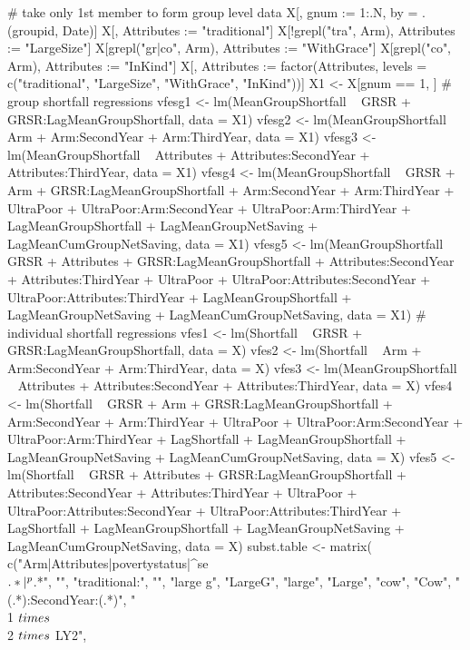 \begin{Schunk}
\begin{Sinput}
# take only 1st member to form group level data
X[, gnum := 1:.N, by = .(groupid, Date)]
X[, Attributes := "traditional"]
X[!grepl("tra", Arm), Attributes := "LargeSize"]
X[grepl("gr|co", Arm), Attributes := "WithGrace"]
X[grepl("co", Arm), Attributes := "InKind"]
X[, Attributes := factor(Attributes, 
  levels = c("traditional", "LargeSize", "WithGrace", "InKind"))]
X1 <- X[gnum == 1, ]
# group shortfall regressions
vfesg1 <- lm(MeanGroupShortfall  ~ 
  GRSR + GRSR:LagMeanGroupShortfall, data = X1)
vfesg2 <- lm(MeanGroupShortfall ~  
  Arm + Arm:SecondYear + Arm:ThirdYear, 
  data = X1)
vfesg3 <- lm(MeanGroupShortfall ~  
  Attributes + Attributes:SecondYear + Attributes:ThirdYear, 
  data = X1)
vfesg4 <- lm(MeanGroupShortfall ~ 
  GRSR + Arm + GRSR:LagMeanGroupShortfall + 
  Arm:SecondYear + Arm:ThirdYear +
  UltraPoor + UltraPoor:Arm:SecondYear + UltraPoor:Arm:ThirdYear +
  LagMeanGroupShortfall +
  LagMeanGroupNetSaving + LagMeanCumGroupNetSaving,
  data = X1)
vfesg5 <- lm(MeanGroupShortfall ~ 
  GRSR + Attributes + GRSR:LagMeanGroupShortfall + 
  Attributes:SecondYear + Attributes:ThirdYear +
  UltraPoor + UltraPoor:Attributes:SecondYear + UltraPoor:Attributes:ThirdYear +
  LagMeanGroupShortfall +
  LagMeanGroupNetSaving + LagMeanCumGroupNetSaving,
  data = X1)
# individual shortfall regressions
vfes1 <- lm(Shortfall  ~ 
  GRSR + GRSR:LagMeanGroupShortfall, data = X)
vfes2 <- lm(Shortfall  ~ 
  Arm + Arm:SecondYear + Arm:ThirdYear, 
  data = X)
vfes3 <- lm(MeanGroupShortfall ~  
  Attributes + Attributes:SecondYear + Attributes:ThirdYear, 
  data = X)
vfes4 <- lm(Shortfall ~ 
  GRSR + Arm + GRSR:LagMeanGroupShortfall + 
  Arm:SecondYear + Arm:ThirdYear +
  UltraPoor + UltraPoor:Arm:SecondYear + UltraPoor:Arm:ThirdYear +
  LagShortfall + LagMeanGroupShortfall +
  LagMeanGroupNetSaving + LagMeanCumGroupNetSaving,
  data = X)
vfes5 <- lm(Shortfall ~ 
  GRSR + Attributes + GRSR:LagMeanGroupShortfall + 
  Attributes:SecondYear + Attributes:ThirdYear +
  UltraPoor + UltraPoor:Attributes:SecondYear + UltraPoor:Attributes:ThirdYear +
  LagShortfall + LagMeanGroupShortfall +
  LagMeanGroupNetSaving + LagMeanCumGroupNetSaving,
  data = X)
subst.table <- matrix(
  c("Arm|Attributes|povertystatus|^se\\$.*|^p\\$.*", "",
    "traditional:", "",
    "large g", "LargeG",
    "large", "Large",
    "cow", "Cow",
    "(.*):SecondYear:(.*)", "\\1 $\\\\times$ \\2 $\\\\times$ LY2",

\end{Sinput}
\end{Schunk}
